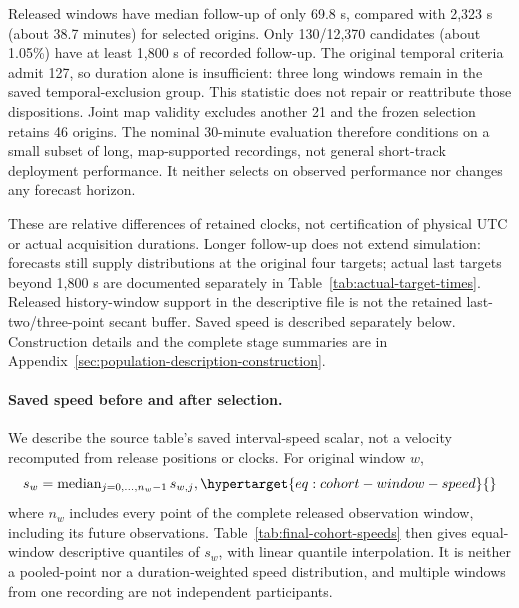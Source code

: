 Released windows have median follow-up of only 69.8 s, compared with 2,323 s
(about 38.7 minutes) for selected origins. Only 130/12,370 candidates
(about 1.05\%) have at least 1,800 s of recorded follow-up. The original
temporal criteria admit 127, so duration alone is insufficient:
three long windows remain in the saved temporal-exclusion group.
This statistic does not repair or reattribute those dispositions.
Joint map validity excludes another 21 and the frozen selection retains 46 origins.
The nominal 30-minute evaluation therefore conditions on a small subset of
long, map-supported recordings, not general short-track deployment performance.
It neither selects on observed performance nor changes any forecast horizon.

These are relative differences of retained clocks, not certification of
physical UTC or actual acquisition durations. Longer follow-up does not
extend simulation: forecasts still supply distributions at the original
four targets; actual last targets beyond 1,800 s are documented separately
in Table~\ref{tab:actual-target-times}. Released history-window support in
the descriptive file is not the retained last-two/three-point secant buffer.
Saved speed is described separately below. Construction details and the
complete stage summaries are in Appendix~\ref{sec:population-description-construction}.

\paragraph{Saved speed before and after selection.}\label{sec:final-cohort-speeds}\hypertarget{sec:final-cohort-speeds}{}
We describe the source table's saved interval-speed scalar, not a velocity
recomputed from release positions or clocks. For original window \(w\),
\begin{equation}
 s_w=\operatorname{median}_{j=0,\ldots,n_w-1}s_{w,j},
 \label{eq:cohort-window-speed}\hypertarget{eq:cohort-window-speed}{}
\end{equation}
where \(n_w\) includes every point of the complete released observation
window, including its future observations. Table~\ref{tab:final-cohort-speeds}
then gives equal-window descriptive quantiles of \(s_w\), with linear
quantile interpolation. It is neither a pooled-point nor a duration-weighted
speed distribution, and multiple windows from one recording are not
independent participants.

